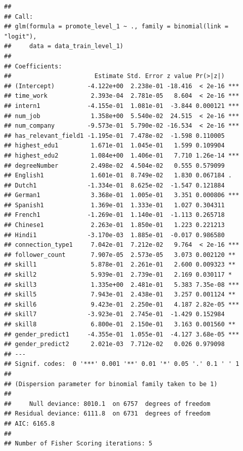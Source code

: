 \documentclass[11pt,]{article}
\begin{document}
\begin{verbatim}
## 
## Call:
## glm(formula = promote_level_1 ~ ., family = binomial(link = "logit"), 
##     data = data_train_level_1)
## 
## Coefficients:
##                       Estimate Std. Error z value Pr(>|z|)    
## (Intercept)         -4.122e+00  2.238e-01 -18.416  < 2e-16 ***
## time_work            2.393e-04  2.781e-05   8.604  < 2e-16 ***
## intern1             -4.155e-01  1.081e-01  -3.844 0.000121 ***
## num_job              1.358e+00  5.540e-02  24.515  < 2e-16 ***
## num_company         -9.573e-01  5.790e-02 -16.534  < 2e-16 ***
## has_relevant_field1 -1.195e-01  7.478e-02  -1.598 0.110005    
## highest_edu1         1.671e-01  1.045e-01   1.599 0.109904    
## highest_edu2         1.084e+00  1.406e-01   7.710 1.26e-14 ***
## degreeNumber         2.498e-02  4.504e-02   0.555 0.579099    
## English1             1.601e-01  8.749e-02   1.830 0.067184 .  
## Dutch1              -1.334e-01  8.625e-02  -1.547 0.121884    
## German1              3.368e-01  1.005e-01   3.351 0.000806 ***
## Spanish1             1.369e-01  1.333e-01   1.027 0.304311    
## French1             -1.269e-01  1.140e-01  -1.113 0.265718    
## Chinese1             2.263e-01  1.850e-01   1.223 0.221213    
## Hindi1              -3.170e-03  1.885e-01  -0.017 0.986580    
## connection_type1     7.042e-01  7.212e-02   9.764  < 2e-16 ***
## follower_count       7.907e-05  2.573e-05   3.073 0.002120 ** 
## skill1               5.878e-01  2.261e-01   2.600 0.009323 ** 
## skill2               5.939e-01  2.739e-01   2.169 0.030117 *  
## skill3               1.335e+00  2.481e-01   5.383 7.35e-08 ***
## skill5               7.943e-01  2.438e-01   3.257 0.001124 ** 
## skill6               9.423e-01  2.250e-01   4.187 2.82e-05 ***
## skill7              -3.923e-01  2.745e-01  -1.429 0.152984    
## skill8               6.800e-01  2.150e-01   3.163 0.001560 ** 
## gender_predict1     -4.355e-01  1.055e-01  -4.127 3.68e-05 ***
## gender_predict2      2.021e-03  7.712e-02   0.026 0.979098    
## ---
## Signif. codes:  0 '***' 0.001 '**' 0.01 '*' 0.05 '.' 0.1 ' ' 1
## 
## (Dispersion parameter for binomial family taken to be 1)
## 
##     Null deviance: 8010.1  on 6757  degrees of freedom
## Residual deviance: 6111.8  on 6731  degrees of freedom
## AIC: 6165.8
## 
## Number of Fisher Scoring iterations: 5
\end{verbatim}
\end{document}
